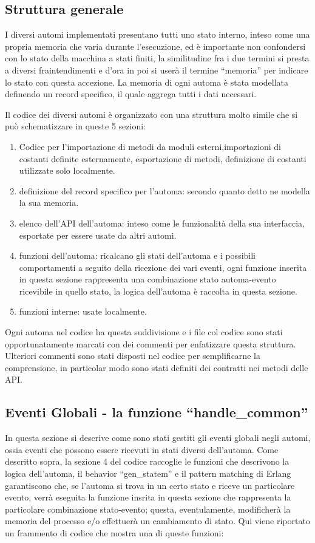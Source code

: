 \subsection{Struttura generale} \label{strutturaGeneraleAutomi}
I diversi automi implementati presentano tutti uno stato interno, inteso come una propria memoria che varia durante l'esecuzione, ed è importante non confondersi con lo stato della macchina a stati finiti, la similitudine fra i due termini si presta a diversi fraintendimenti e d'ora in poi si userà il termine ``memoria'' per indicare lo stato con questa accezione. La memoria di ogni automa è stata modellata definendo un record specifico, il quale aggrega tutti i dati necessari.

Il codice dei diversi automi è organizzato con una struttura molto simile che si può schematizzare in queste 5 sezioni:

\begin{enumerate}
	\item Codice per l'importazione di metodi da moduli esterni,importazioni di costanti definite esternamente, esportazione di metodi, definizione di costanti utilizzate solo localmente.
	\item definizione del record specifico per l'automa: secondo quanto detto ne modella la sua memoria.
	\item elenco dell'API dell'automa: inteso come le funzionalità della sua interfaccia, esportate per essere usate da altri automi.
	\item funzioni dell'automa: ricalcano gli stati dell'automa e i possibili comportamenti a seguito della ricezione dei vari eventi, ogni funzione inserita in questa sezione rappresenta una combinazione stato automa-evento ricevibile in quello stato, la logica dell'automa è raccolta in questa sezione.
	\item funzioni interne: usate localmente.
\end{enumerate}

Ogni automa nel codice ha questa suddivisione e i file col codice sono stati opportunatamente marcati con dei commenti per enfatizzare questa struttura. Ulteriori commenti sono stati disposti nel codice per semplificarne la comprensione, in particolar modo sono stati definiti dei contratti nei metodi delle API.

\subsection{Eventi Globali - la funzione ``handle\_common''} \label{eventiGlobaliAutomi}
In questa sezione si descrive come sono stati gestiti gli eventi globali negli automi, ossia eventi che possono essere ricevuti in stati diversi dell'automa. Come descritto sopra, la sezione 4 del codice raccoglie le funzioni che descrivono la logica dell'automa, il behavior ``gen\_statem'' e il pattern matching di Erlang garantiscono che, se l'automa si trova in un certo stato e riceve un particolare evento, verrà eseguita la funzione insrita in questa sezione che rappresenta la particolare combinazione stato-evento; questa, eventulamente, modificherà la memoria del processo e/o  effettuerà un cambiamento di stato. 
Qui viene riportato un frammento di codice che mostra una di queste funzioni: 

